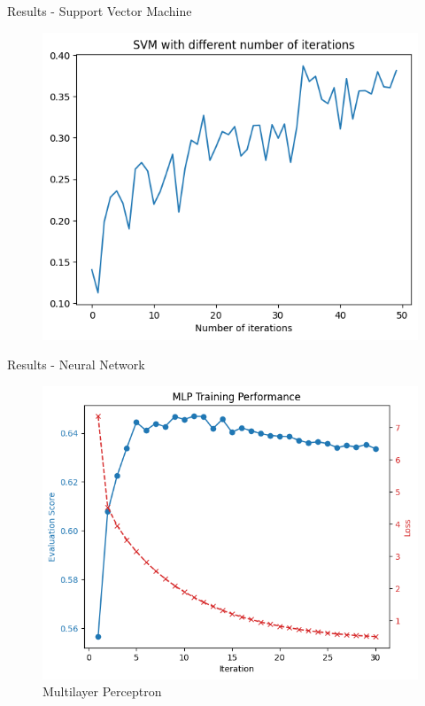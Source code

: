 \documentclass{beamer}
\begin{document}
\begin{frame}[t]{Results - Support Vector Machine}
	\vspace{-3mm}
	\begin{figure}[h]
		\centering
		\includegraphics[width=0.8\linewidth]{images/SVM/precision.png}
	\end{figure}
\end{frame}


\begin{frame}[t]{Results - Neural Network}
	\vspace{-3mm}
	\begin{figure}[h]
		\caption{Multilayer Perceptron}
		\centering
		\includegraphics[width=0.73\linewidth]{images/MLP/mlp_over_iters.png}
	\end{figure}
\end{frame}
\end{document}
